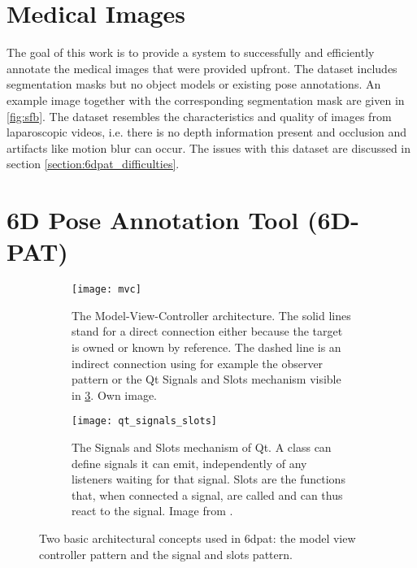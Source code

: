 \section{Medical Images}

The goal of this work is to provide a system to successfully and efficiently annotate the medical images that were provided upfront. The dataset includes segmentation masks but no object models or existing pose annotations. An example image together with the corresponding segmentation mask are given in \fig \ref{fig:sfb}. The dataset resembles the characteristics and quality of images from laparoscopic videos, i.e. there is no depth information present and occlusion and artifacts like motion blur can occur. The issues with this dataset are discussed in section \ref{section:6dpat_difficulties}. 

\section{6D Pose Annotation Tool (6D-PAT)}

\begin{figure}[!tbp]
	\centering
	\begin{subfigure}[t]{0.47\textwidth}
		\centering
    	\texttt{[image: mvc]}
    	\caption{The Model-View-Controller architecture. The solid lines stand for a direct connection either because the target is owned or known by reference. The dashed line is an indirect connection using for example the observer pattern or the Qt Signals and Slots mechanism visible in \fig \ref{fig:qt_signals_slots}. Own image.}
    	\label{fig:mvc}
	\end{subfigure}
	\hfill
	\begin{subfigure}[t]{0.47\textwidth}
	\centering
    	\texttt{[image: qt\_signals\_slots]}
    	\caption{The Signals and Slots mechanism of Qt. A class can define signals it can emit, independently of any listeners waiting for that signal. Slots are the functions that, when connected a signal, are called and can thus react to the signal. Image from \cite{qt_signals_and_slots}.}
    	\label{fig:qt_signals_slots}
	\end{subfigure}
	\caption{Two basic architectural concepts used in \gls{6dpat}: the model view controller pattern and the signal and slots pattern.}
\end{figure} 

